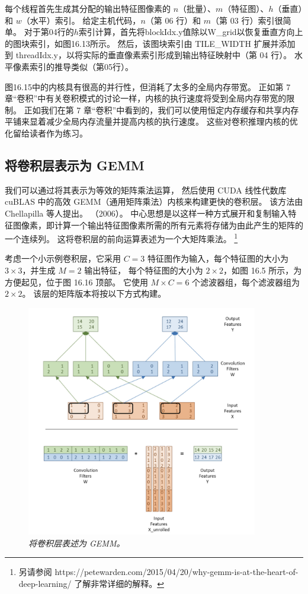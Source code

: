 每个线程首先生成其分配的输出特征图像素的 $n$（批量）、$m$（特征图）、$h$（垂直）和 $w$（水平）索引。 
给定主机代码，$n$（第 06 行）和 $m$（第 03 行）索引很简单。 
对于第04行的$h$索引计算，首先将blockIdx.y值除以W\_grid以恢复垂直方向上的图块索引，如图16.13所示。 
然后，该图块索引由 TILE\_WIDTH 扩展并添加到 threadIdx.y，以将实际的垂直像素索引形成到输出特征映射中（第 04 行）。 
水平像素索引的推导类似（第05行）。

图16.15中的内核具有很高的并行性，但消耗了太多的全局内存带宽。 
正如第 7 章“卷积”中有关卷积模式的讨论一样，内核的执行速度将受到全局内存带宽的限制。 
正如我们在第 7 章“卷积”中看到的，我们可以使用恒定内存缓存和共享内存平铺来显着减少全局内存流量并提高内核的执行速度。 
这些对卷积推理内核的优化留给读者作为练习。

\subsection{将卷积层表示为 GEMM}
我们可以通过将其表示为等效的矩阵乘法运算，
然后使用 CUDA 线性代数库 cuBLAS 中的高效 GEMM（通用矩阵乘法）内核来构建更快的卷积层。 
该方法由 Chellapilla 等人提出。 （2006）。 
中心思想是以这样一种方式展开和复制输入特征图像素，即计算一个输出特征图像素所需的所有元素将存储为由此产生的矩阵的一个连续列。 
这将卷积层的前向运算表述为一个大矩阵乘法。
\footnote{另请参阅 https://petewarden.com/2015/04/20/why-gemm-is-at-the-heart-of-deep-learning/ 了解非常详细的解释。}

考虑一个小示例卷积层，它采用 $C=3$ 特征图作为输入，每个特征图的大小为 $3 \times 3$，并生成 $M=2$ 输出特征，
每个特征图的大小为 $2 \times 2 $，如图 16.5 所示，为方便起见，位于图 16.16 顶部。 
它使用 $M \times C=6$ 个滤波器组，每个滤波器组为 $2 \times 2$。 该层的矩阵版本将按以下方式构建。

\begin{figure}[H]
	\centering
	\includegraphics[width=0.9\textwidth]{figs/F16.16.png}
	\caption{\textit{将卷积层表述为 GEMM。}}
\end{figure}

